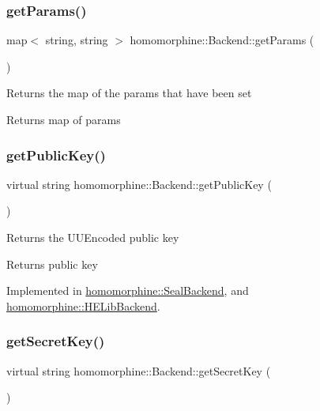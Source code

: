 \subsubsection{\texorpdfstring{getParams()}{getParams()}}
{\footnotesize\ttfamily map$<$ string, string $>$ homomorphine\+::\+Backend\+::get\+Params (\begin{DoxyParamCaption}{ }\end{DoxyParamCaption})}

Returns the map of the params that have been set

\begin{DoxyReturn}{Returns}
map of params 
\end{DoxyReturn}
\mbox{\label{classhomomorphine_1_1_backend_a8bba422ac5b13e77030a884cfd6a0463}} 
\subsubsection{\texorpdfstring{getPublicKey()}{getPublicKey()}}
{\footnotesize\ttfamily virtual string homomorphine\+::\+Backend\+::get\+Public\+Key (\begin{DoxyParamCaption}{ }\end{DoxyParamCaption})\hspace{0.3cm}{\ttfamily [pure virtual]}}

Returns the U\+U\+Encoded public key

\begin{DoxyReturn}{Returns}
public key 
\end{DoxyReturn}


Implemented in \mbox{\hyperlink{classhomomorphine_1_1_seal_backend_aa2dce269303eaa73c62dbfacce66dc1a}{homomorphine\+::\+Seal\+Backend}}, and \mbox{\hyperlink{classhomomorphine_1_1_h_e_lib_backend_a8b096d4780f3b65f0fa0cb3ca6cb9ab8}{homomorphine\+::\+H\+E\+Lib\+Backend}}.

\mbox{\label{classhomomorphine_1_1_backend_a456cb97febfd3819ab400d9583c97153}} 
\subsubsection{\texorpdfstring{getSecretKey()}{getSecretKey()}}
{\footnotesize\ttfamily virtual string homomorphine\+::\+Backend\+::get\+Secret\+Key (\begin{DoxyParamCaption}{ }\end{DoxyParamCaption})\hspace{0.3cm}{\ttfamily [pure virtual]}}

